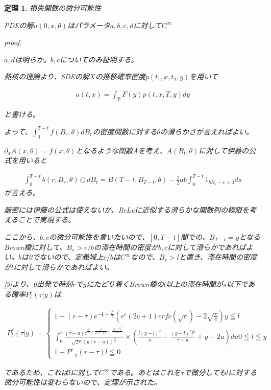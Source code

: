 \documentclass{jsarticle}
\newtheorem{theo}{定理}[section]
\begin{document}
\begin{theo} 損失関数の微分可能性

PDEの解$u(0,x,\theta)$はパラメータ$a,b,c,d$に対して$C^\infty$



proof.

$a,d$は明らか。$b,c$についてのみ証明する。

熱核の理論より、SDEの解$X$の推移確率密度$p(t_1,x,t_2,y)$を用いて

\begin{align}
u(t,x)=\int_\mathbb{R}F(y)p(t,x,T,y)dy
\end{align}

と書ける。

よって、$\int_0^{T-t} f(B_r,\theta)dB_r$の密度関数に対する$\theta$の滑らかさが言えればよい。

$\partial_x A(x,\theta)=f(x,\theta)$となるような関数$A$を考え、$A(B_t,\theta)$に対して伊藤の公式を用いると

\begin{align}
\int^{T-t}_0b(r,B_r,\theta)\odot dB_t=B(T-t,B_{T-t},\theta)-\frac{1}{2}ab\int^{T-t}_0 1_{bB_s-c>0}ds
\end{align}
が言える。

厳密には伊藤の公式は使えないが、ReLuに近似する滑らかな関数列の極限を考えることで実現する。


ここから、$b,c$の微分可能性を言いたいので、$[0,T-t]$間での、$B_{T-t}=y$となるBrown橋に対して、$B_s>c/b$の滞在時間の密度が$b,c$に対して滑らかであればよい。$b$は0でないので、定義域上$c/b$は$C^\infty$なので、$B_s>l$と置き、滞在時間の密度が$l$に対して滑らかであればよい。

[9]より、0出発で時刻$r$で$y$にたどり着くBrown橋の$l$以上の滞在時間が$s$以下である確率$P^s_l(\tau|y)$は




\begin{align}
P^r_l(\tau|y)=\begin{cases}
    1-(r-\tau)e^{-\frac{c}{\tau}+\frac{y^2}{2}} (e^c(2c+1)erfc(\sqrt{c})-2\sqrt{\frac{c}{\pi}})　y\leqq l\\
    \int^\tau_0\frac{(\tau-u)e^{\frac{y^2}{2}-\frac{l^2}{2(r-u)}-\frac{(y-l)^2}{2u}}}{\sqrt{2\pi}(u(r-u))^{\frac{3}{2}}}\times (\frac{l(y-l)^2}{u}-\frac{(y-l)^2l^2}{r-u}+y-2u)du　0\leqq l \leqq y\\
    1-P^r_{-y}(r-\tau)　l\leqq 0
\end{cases}
\end{align}

であるため、これは$l$に対して$C^\infty$である。あとはこれを$\tau$で微分しても$l$に対する微分可能性は変わらないので、定理が示された。


\end{theo}
\end{document}
